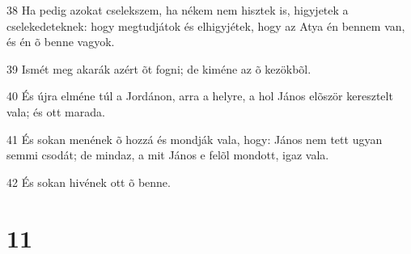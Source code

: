 \par 38 Ha pedig azokat cselekszem, ha nékem nem hisztek is, higyjetek a cselekedeteknek: hogy megtudjátok és elhigyjétek, hogy az Atya én bennem van,  és én õ benne vagyok.
\par 39 Ismét meg akarák azért õt fogni; de kiméne az õ kezökbõl.
\par 40 És újra elméne túl a Jordánon, arra a helyre, a hol János elõször keresztelt vala; és ott marada.
\par 41 És sokan menének õ hozzá és mondják vala, hogy: János nem tett ugyan semmi csodát; de mindaz, a mit János e felõl mondott, igaz vala.
\par 42 És sokan hivének ott õ benne.

\chapter{11}

